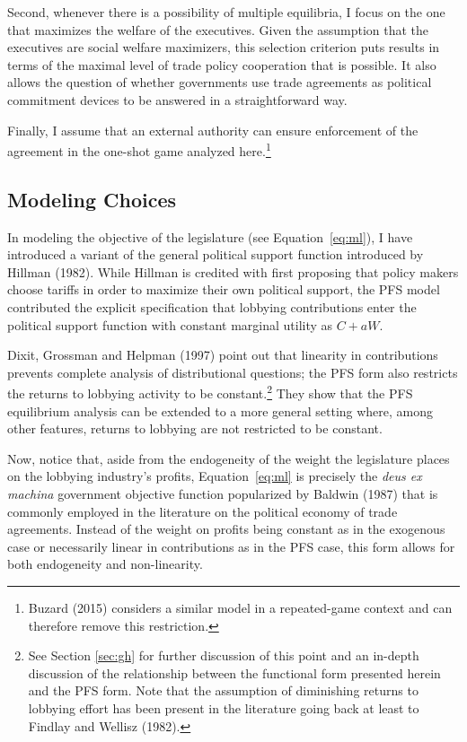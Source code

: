 \documentclass[10pt]{article}
\begin{document}
Second, whenever there is a possibility of multiple equilibria, I focus on the one that maximizes the welfare of the executives. Given the assumption that the executives are social welfare maximizers, this selection criterion puts results in terms of the maximal level of trade policy cooperation that is possible. It also allows the question of whether governments use trade agreements as political commitment devices to be answered in a straightforward way.

Finally, I assume that an external authority can ensure enforcement of the agreement in the one-shot game analyzed here.\footnote{Buzard (2015) considers a similar model in a repeated-game context and can therefore remove this restriction.} 


\subsection{Modeling Choices}
\label{sec:choices}

In modeling the objective of the legislature (see Equation~\ref{eq:ml}), I have introduced a variant of the general political support function introduced by Hillman (1982). While Hillman is credited with first proposing that policy makers choose tariffs in order to maximize their own political support, the PFS model contributed the explicit specification that lobbying contributions enter the political support function with constant marginal utility as $C + aW$.

Dixit, Grossman and Helpman (1997) point out that linearity in contributions prevents complete analysis of distributional questions; the PFS form also restricts the returns to lobbying activity to be constant.\footnote{See Section \ref{sec:gh} for further discussion of this point and an in-depth discussion of the relationship between the functional form presented herein and the PFS form. Note that the assumption of diminishing returns to lobbying effort has been present in the literature going back at least to Findlay and Wellisz (1982).} They show that the PFS equilibrium analysis can be extended to a more general setting where, among other features, returns to lobbying are not restricted to be constant. 

Now, notice that, aside from the endogeneity of the weight the legislature places on the lobbying industry's profits, Equation~\ref{eq:ml} is precisely the \textit{deus ex machina} government objective function popularized by Baldwin (1987) that is commonly employed in the literature on the political economy of trade agreements. Instead of the weight on profits being constant as in the exogenous case or necessarily linear in contributions as in the PFS case, this form allows for both endogeneity and non-linearity.
\end{document}
